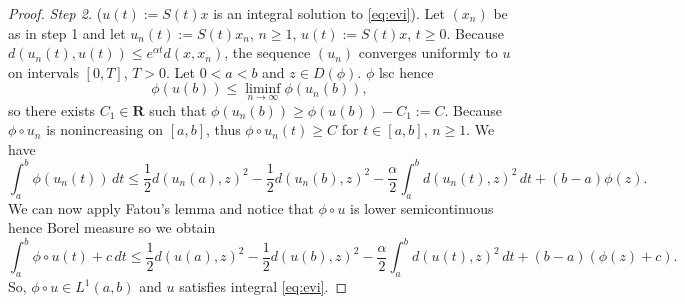 \documentclass[a4paper,11pt, leqno]{scrreprt} %
\renewcommand{\leq}{\leqslant}
\renewcommand{\leq}{\leqslant}
\renewcommand{\geq}{\geqslant}
\newcommand{\R}{\mathbf R}
\theoremstyle{change}
\theoremstyle{nonumberplain}
\newtheorem{proof}{Proof}
\begin{document}
\begin{proof}
  \textit{Step 2.} ($u(t) := S(t)x$ is an integral solution to
  \eqref{eq:evi}). Let $(x_n)$ be as in step 1 and let $u_n(t) :=
  S(t)x_n$, $n \geq 1$, $u(t) := S(t)x$, $t \geq 0$. Because
  $d(u_n(t), u(t)) \leq e^{\alpha t} d(x, x_n)$, the sequence $(u_n)$
  converges uniformly to $u$ on intervals $[0, T]$, $T > 0$. Let $0 <
  a < b$ and $z \in D(\phi)$. $\phi$ lsc hence
  \begin{equation}
    \label{eq:ms_thm_2_16}
    \phi(u(b)) \leq \liminf_{n \to \infty} \phi(u_n(b)),
  \end{equation}
  so there exists $C_1 \in \R$ such that $\phi(u_n(b)) \geq \phi(u(b))
  - C_1 := C$. Because $\phi \circ u_n$ is nonincreasing on $[a,b]$,
  thus $\phi \circ u_n(t) \geq C$ for $t \in [a,b]$, $n \geq 1$. We
  have
  \begin{equation}
    \label{eq:ms_thm_2_17}
    \int_a^b \phi(u_n(t)) \, dt \leq \frac12 d(u_n(a), z)^2 - \frac12
    d(u_n(b), z)^2 - \frac\alpha2 \int_a^b d(u_n(t), z)^2 \, dt + (b - a)\phi(z).
  \end{equation}
  We can now apply Fatou's lemma and notice that $\phi \circ u$ is
  lower semicontinuous hence Borel measure so we obtain
  \begin{equation}
    \label{eq:ms_thm_2_18}
    \int_a^b \phi \circ u(t) + c \, dt \leq \frac12 d(u(a), z)^2 -
    \frac12 d(u(b), z)^2 - \frac\alpha2 \int_a^b d(u(t), z)^2 \, dt +
    (b - a)(\phi(z) + c).
  \end{equation}
  So, $\phi \circ u \in L^1(a,b)$ and $u$ satisfies integral
  \ref{eq:evi}.


\end{proof}
\end{document}
